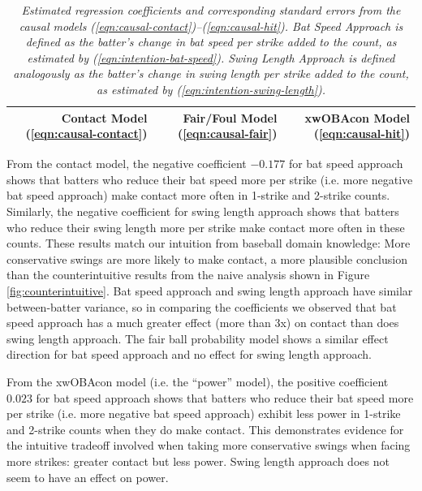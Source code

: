 \documentclass{article}
\begin{document}
      \begin{table}[H]
        \centering
        \begin{tabular}{l|r|r|r|}
          & Contact Model (\ref{eqn:causal-contact}) & Fair/Foul Model (\ref{eqn:causal-fair}) & xwOBAcon Model (\ref{eqn:causal-hit})\\
          \hline
          
        \end{tabular}
        \caption{\it Estimated regression coefficients and corresponding standard errors from the causal models (\ref{eqn:causal-contact})--(\ref{eqn:causal-hit}). Bat Speed Approach is defined as the batter's change in bat speed per strike added to the count, as estimated by (\ref{eqn:intention-bat-speed}). Swing Length Approach is defined analogously as the batter's change in swing length per strike added to the count, as estimated by (\ref{eqn:intention-swing-length}).}
        \label{tab:causal-model}
      \end{table}

      From the contact model, the negative coefficient $-0.177$ for bat speed approach shows that batters who reduce their bat speed more per strike (i.e. more negative bat speed approach) make contact more often in 1-strike and 2-strike counts. Similarly, the negative coefficient for swing length approach shows that batters who reduce their swing length more per strike make contact more often in these counts. These results match our intuition from baseball domain knowledge: More conservative swings are more likely to make contact, a more plausible conclusion than the counterintuitive results from the naive analysis shown in Figure \ref{fig:counterintuitive}. Bat speed approach and swing length approach have similar between-batter variance, so in comparing the coefficients we observed that bat speed approach has a much greater effect (more than 3x) on contact than does swing length approach. The fair ball probability model shows a similar effect direction for bat speed approach and no effect for swing length approach.

      From the xwOBAcon model (i.e. the ``power'' model), the positive coefficient $0.023$ for bat speed approach shows that batters who reduce their bat speed more per strike (i.e. more negative bat speed approach) exhibit less power in 1-strike and 2-strike counts when they do make contact. This demonstrates evidence for the intuitive tradeoff involved when taking more conservative swings when facing more strikes: greater contact but less power. Swing length approach does not seem to have an effect on power.
\end{document}
